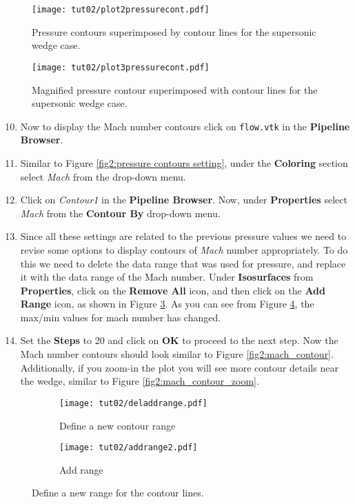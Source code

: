\begin{figure}[ht]
    \centering
    \texttt{[image: tut02/plot2pressurecont.pdf]}
    \caption{Pressure contours superimposed by contour lines for the supersonic wedge case.}
    \label{fig2:pressure_contour_lines}
\end{figure}
\begin{figure}[H]
    \centering
    \texttt{[image: tut02/plot3pressurecont.pdf]}
    \caption{Magnified pressure contour superimposed with contour lines for the supersonic wedge case.}
    \label{fig2:pressure_contour_lines_zoom}
\end{figure}
\begin{enumerate}[label=\arabic*)]
	\setcounter{enumi}{9}
	\item Now to display the Mach number contours click on \texttt{flow.vtk} in the \textbf{Pipeline Browser}.
	\item Similar to Figure \ref{fig2:pressure contours setting}, under the \textbf{Coloring} section select \textit{Mach} from the drop-down menu.
	\item Click on \textit{Contour1} in the \textbf{Pipeline Browser}. Now, under \textbf{Properties} select \textit{Mach} from the \textbf{Contour By} drop-down menu.
	\item Since all these settings are related to the previous pressure values we need to revise some options to display contours of \textit{Mach} number appropriately. To do this we need to delete the data range that was used for pressure, and replace it with the data range of the Mach number. Under \textbf{Isosurfaces} from \textbf{Properties}, click on the \textbf{Remove All} icon, and then click on the \textbf{Add Range} icon, as shown in Figure \ref{fig2:contourby2 a}. As you can see from Figure \ref{fig2:contourby2 b}, the max/min values for mach number has changed.
	\item Set the \textbf{Steps} to 20 and click on \textbf{OK} to proceed to the next step. Now the Mach number contours should look similar to Figure \ref{fig2:mach_contour}. Additionally, if you zoom-in the plot you will see more contour details near the wedge, similar to Figure \ref{fig2:mach_contour_zoom}.
\end{enumerate}
\begin{figure}[ht]
    \centering
     \begin{subfigure}[b]{.4\textwidth}
         \centering
         \texttt{[image: tut02/deladdrange.pdf]}
         \caption{Define a new contour range}
         \label{fig2:contourby2 a}
     \end{subfigure}
     \hfill
     \begin{subfigure}[b]{.4\textwidth}
         \centering
         \texttt{[image: tut02/addrange2.pdf]}
         \caption{Add range}
         \label{fig2:contourby2 b}
     \end{subfigure}     
    \caption{Define a new range for the contour lines.}
    \label{fig2:contourby2}
\end{figure}
